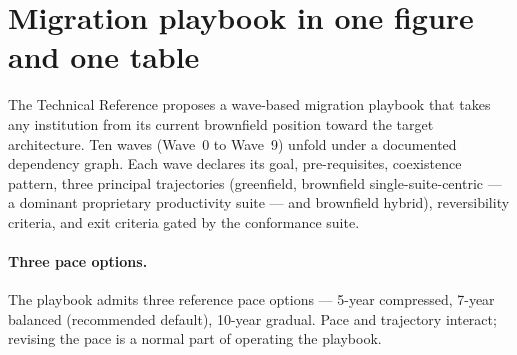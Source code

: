 \section{Migration playbook in one figure and one table}
\label{sec:synth-migration}

The Technical Reference proposes a wave-based migration playbook
that takes any institution from its current brownfield position
toward the target architecture. Ten waves (Wave~0 to Wave~9)
unfold under a documented dependency graph. Each wave declares
its goal, pre-requisites, coexistence pattern, three principal
trajectories (greenfield, brownfield single-suite-centric --- a
dominant proprietary productivity suite --- and brownfield hybrid),
reversibility criteria,
and exit criteria gated by the conformance suite.

\paragraph{Three pace options.} The playbook admits three reference
pace options --- 5-year compressed, 7-year balanced (recommended
default), 10-year gradual. Pace and trajectory interact; revising
the pace is a normal part of operating the playbook.


